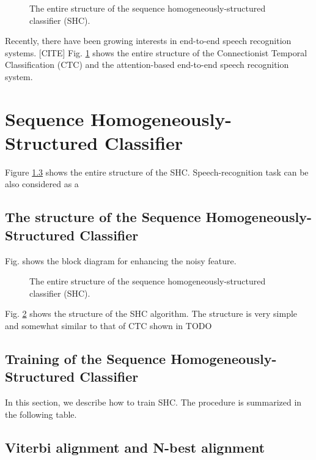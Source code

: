 \documentclass{article}
\begin{document}
\begin{figure}
    \centering
    \resizebox{40mm}{!}{%
         } %
    \caption {
      The entire structure of the sequence homogeneously-structured classifier
      (SHC).
      \label{fig:ctc_diagram}
    }
\end{figure}
Recently, there have been growing interests in end-to-end speech
recognition systems.  [CITE] Fig. \ref{fig:ctc_diagram} shows the
entire structure of the Connectionist Temporal Classification (CTC) 
and the attention-based end-to-end speech recognition system.



\section{Sequence Homogeneously-Structured Classifier}
Figure \ref{} shows the entire structure of the SHC. Speech-recognition
task can be also considered as a 



\subsection{The structure of the Sequence Homogeneously-Structured Classifier}


Fig. \label{fig:entire_diagram} shows the block diagram for
enhancing the noisy feature.

\begin{figure}
    \centering
    \resizebox{50mm}{!}{%
         } %
    \caption {
      The entire structure of the sequence homogeneously-structured classifier
      (SHC).
      \label{fig:shc_diagram}
    }
\end{figure}

Fig. \ref{fig:shc_diagram} shows the structure of the SHC algorithm. The
structure is very simple and somewhat similar to that of CTC shown in TODO


\subsection{Training of the Sequence Homogeneously-Structured Classifier}
In this section, we describe how to train SHC. The procedure is summarized
in the following table.

\subsection{Viterbi alignment and N-best alignment}
\end{document}
